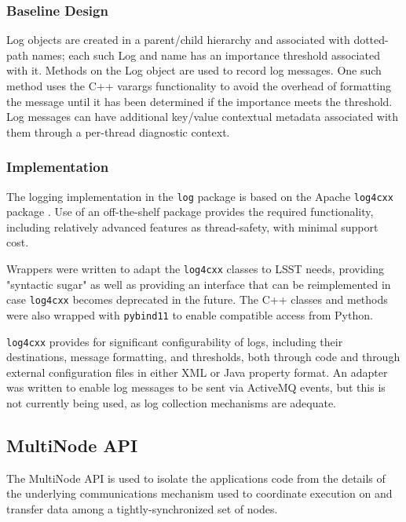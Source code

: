 \documentclass[DM,lsstdraft,toc]{lsstdoc}
\begin{document}
\subsubsection{Baseline Design}\label{logging-design}

Log objects are created in a parent/child hierarchy and associated with
dotted-path names; each such Log and name has an importance threshold
associated with it. Methods on the Log object are used to record log messages.
One such method uses the C++ varargs functionality to avoid the overhead of
formatting the message until it has been determined if the importance meets the
threshold. Log messages can have additional key/value contextual metadata
associated with them through a per-thread diagnostic context.

\subsubsection{Implementation}\label{logging-implementation}

The logging implementation in the \texttt{log} package is based on the Apache
\texttt{log4cxx} package \citep{log4cxx}.
Use of an off-the-shelf package provides the required functionality, including
relatively advanced features as thread-safety, with minimal support cost.

Wrappers were written to adapt the \texttt{log4cxx} classes to LSST needs,
providing "syntactic sugar" as well as providing an interface that can be
reimplemented in case \texttt{log4cxx} becomes deprecated in the future.  The
C++ classes and methods were also wrapped with \texttt{pybind11} to enable
compatible access from Python.

\texttt{log4cxx} provides for significant configurability of logs, including
their destinations, message formatting, and thresholds, both through code and
through external configuration files in either XML or Java property format.
An adapter was written to enable log messages to be sent via ActiveMQ events,
but this is not currently being used, as log collection mechanisms are
adequate.


\subsection{MultiNode API}\label{multinode-api}

The MultiNode API is used to isolate the applications code from the details of
the underlying communications mechanism used to coordinate execution on and
transfer data among a tightly-synchronized set of nodes.
\end{document}
